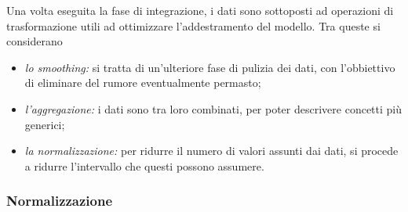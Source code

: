 \documentclass{subfiles}
\begin{document}
Una volta eseguita la fase di integrazione, i dati sono sottoposti ad operazioni di trasformazione utili ad ottimizzare l'addestramento del modello.
Tra queste si considerano
\begin{itemize}
    \item \emph{lo smoothing:} si tratta di un'ulteriore fase di pulizia dei dati, con l'obbiettivo di eliminare del rumore eventualmente permasto;
    \item \emph{l'aggregazione:} i dati sono tra loro combinati, per poter descrivere concetti più generici;
    \item \emph{la normalizzazione:} per ridurre il numero di valori assunti dai dati, si procede a ridurre l'intervallo che questi possono assumere.
\end{itemize}
\clearpage
\subsubsection{Normalizzazione}

\end{document}
